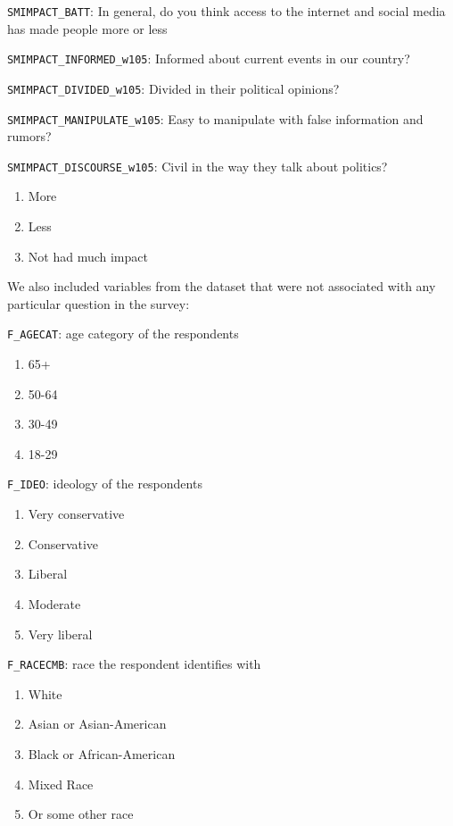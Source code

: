 \documentclass[
]{article}
\begin{document}
\texttt{SMIMPACT\_BATT}: In general, do you think access to the internet
and social media has made people more or less

\texttt{SMIMPACT\_INFORMED\_w105}: Informed about current events in our
country?

\texttt{SMIMPACT\_DIVIDED\_w105}: Divided in their political opinions?

\texttt{SMIMPACT\_MANIPULATE\_w105}: Easy to manipulate with false
information and rumors?

\texttt{SMIMPACT\_DISCOURSE\_w105}: Civil in the way they talk about
politics?

\begin{enumerate}
\def\labelenumi{\arabic{enumi})}
\item
  More
\item
  Less
\item
  Not had much impact
\end{enumerate}

We also included variables from the dataset that were not associated
with any particular question in the survey:

\texttt{F\_AGECAT}: age category of the respondents

\begin{enumerate}
\def\labelenumi{\arabic{enumi})}
\item
  65+
\item
  50-64
\item
  30-49
\item
  18-29
\end{enumerate}

\texttt{F\_IDEO}: ideology of the respondents

\begin{enumerate}
\def\labelenumi{\arabic{enumi})}
\item
  Very conservative
\item
  Conservative
\item
  Liberal
\item
  Moderate
\item
  Very liberal
\end{enumerate}

\texttt{F\_RACECMB}: race the respondent identifies with

\begin{enumerate}
\def\labelenumi{\arabic{enumi})}
\item
  White
\item
  Asian or Asian-American
\item
  Black or African-American
\item
  Mixed Race
\item
  Or some other race
\end{enumerate}
\end{document}
